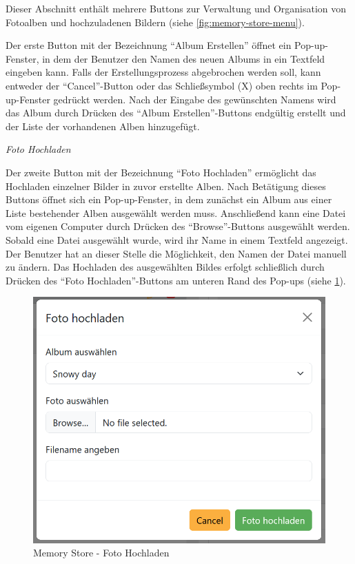Dieser Abschnitt enthält mehrere Buttons zur Verwaltung und Organisation von Fotoalben 
und hochzuladenen Bildern (siehe \ref{fig:memory-store-menu}).

Der erste Button mit der Bezeichnung ``Album Erstellen'' öffnet ein Pop-up-Fenster, 
in dem der Benutzer den Namen des neuen Albums in ein Textfeld eingeben kann. 
Falls der Erstellungsprozess abgebrochen werden soll, kann entweder der 
``Cancel''-Button oder das Schlie\ss{}symbol (X) oben rechts im Pop-up-Fenster gedrückt 
werden. Nach der Eingabe des gewünschten Namens wird das Album durch Drücken 
des ``Album Erstellen''-Buttons endgültig erstellt und der Liste der vorhandenen 
Alben hinzugefügt.


\emph{Foto Hochladen}

Der zweite Button mit der Bezeichnung ``Foto Hochladen'' ermöglicht das Hochladen 
einzelner Bilder in zuvor erstellte Alben. Nach Betätigung dieses Buttons öffnet 
sich ein Pop-up-Fenster, in dem zunächst ein Album aus einer Liste bestehender Alben 
ausgewählt werden muss. Anschlie\ss{}end kann eine Datei vom eigenen Computer durch 
Drücken des ``Browse''-Buttons ausgewählt werden. Sobald eine Datei ausgewählt wurde, 
wird ihr Name in einem Textfeld angezeigt. Der Benutzer hat an dieser Stelle die 
Möglichkeit, den Namen der Datei manuell zu ändern. Das Hochladen des ausgewählten 
Bildes erfolgt schlie\ss{}lich durch Drücken des ``Foto Hochladen''-Buttons am unteren 
Rand des Pop-ups (siehe \ref{fig:memory-store-foto-hochladen}).

\begin{figure}
    \centering
    \includegraphics[scale=0.4]{pics/memory_store_teil1_button2.PNG}
    \caption{Memory Store - Foto Hochladen}
    \label{fig:memory-store-foto-hochladen}
\end{figure}


